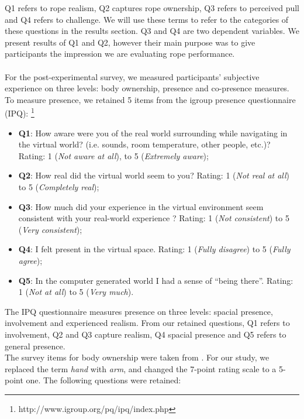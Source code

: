 Q1 refers to rope realism, Q2 captures rope ownership, Q3 refers to perceived pull and Q4 refers to challenge. We will use these terms to refer to the categories of these questions in the results section. Q3 and Q4 are two dependent variables. We present results of Q1 and Q2, however their main purpose was to give participants the impression we are evaluating rope performance.\\
\\
For the post-experimental survey, we measured participants' subjective experience on three levels: body ownership, presence and co-presence measures. 
To measure presence, we retained 5 items from the igroup presence questionnaire (IPQ): \footnote{http://www.igroup.org/pq/ipq/index.php}
\begin{itemize}
\label{enum:presenceQuestions}
\itemsep0em
    \item \textbf{Q1}: How aware were you of the real world surrounding while navigating in the virtual world? (i.e. sounds, room temperature, other people, etc.)? Rating: 1 (\textit{Not aware at all}), to 5 (\textit{Extremely aware});
    \item \textbf{Q2}: How real did the virtual world seem to you? Rating: 1 (\textit{Not real at all}) to 5 (\textit{Completely real});
    \item \textbf{Q3}: How much did your experience in the virtual environment seem consistent with your real-world experience ?  Rating: 1 (\textit{Not consistent}) to 5 (\textit{Very consistent});
    \item \textbf{Q4}: I felt present in the virtual space. Rating: 1 (\textit{Fully disagree}) to 5 (\textit{Fully agree});
    \item \textbf{Q5}: In the computer generated world I had a sense of ``being there''.  Rating: 1 (\textit{Not at all}) to 5 (\textit{Very much}). 
\end{itemize}
The IPQ questionnaire measures presence on three levels: spacial presence, involvement and experienced realism. From our retained questions, Q1 refers to involvement, Q2 and Q3 capture realism, Q4 spacial presence and Q5 refers to general presence.
\\
The survey items for body ownership were taken from \cite{argelaguet2016role}. For our study, we replaced the term \textit{hand} with \textit{arm}, and changed the 7-point rating scale to a 5-point one. The following questions were retained:

